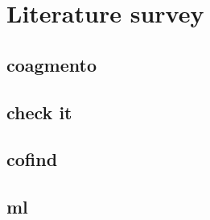 \chapter{Literature survey}

\section{coagmento}

\section{check it}

\section{cofind}

\section{ml}

